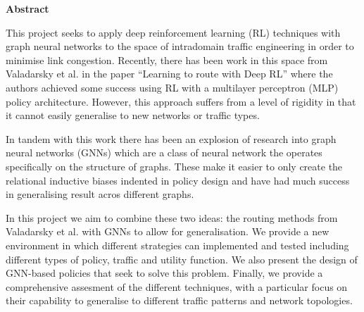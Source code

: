 \newpage
{\Huge \bf Abstract}
\vspace{24pt} 

This project seeks to apply deep reinforcement learning (RL) techniques with graph neural networks to the space of intradomain traffic engineering in order to minimise link congestion. Recently, there has been work in this space from Valadarsky et al. in the paper ``Learning to route with Deep RL'' where the authors achieved some success using RL with a multilayer perceptron (MLP) policy architecture. However, this approach suffers from a level of rigidity in that it cannot easily generalise to new networks or traffic types.

In tandem with this work there has been an explosion of research into graph neural networks (GNNs) which are a class of neural network the operates specifically on the structure of graphs. These make it easier to only create the relational inductive biases indented in policy design and have had much success in generalising result acros different graphs.

In this project we aim to combine these two ideas: the routing methods from Valadarsky et al. with GNNs to allow for generalisation. We provide a new environment in which different strategies can implemented and tested including different types of policy, traffic and utility function. We also present the design of GNN-based policies that seek to solve this problem. Finally, we provide a comprehensive assesment of the different techniques, with a particular focus on their capability to generalise to different traffic patterns and network topologies.

\newpage
\vspace*{\fill}
